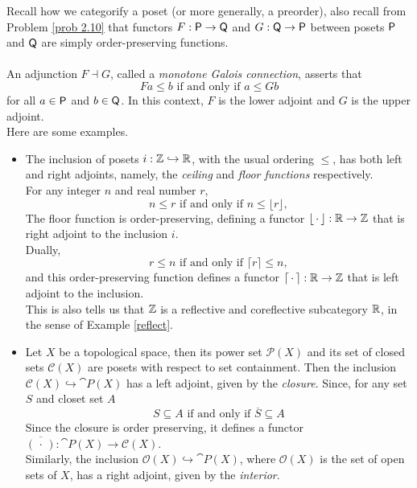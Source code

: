 \begin{example}
Recall how we categorify a poset (or more generally, a preorder), also recall from Problem \ref{prob 2.10} that functors $F : \mathsf{P} \to \mathsf{Q}$ and $G: \mathsf{Q} \to \mathsf{P}$ between posets $\mathsf{P}$ and $\mathsf{Q}$ are simply order-preserving functions.\\
\\
An adjunction $F \dashv G$, called a \emph{monotone Galois connection}, asserts that
\[Fa \leq b \text{ if and only if } a \leq Gb\]
for all $a \in \mathsf{P}$ and $b \in \mathsf{Q}$. In this context, $F$ is the lower adjoint and $G$ is the upper adjoint.\\[0.5em]
Here are some examples.
\begin{itemize}
\item The inclusion of posets $i:\mathbb Z \hookrightarrow \mathbb R$, with the usual ordering $\leq$, has both left and right adjoints, namely, the \emph{ceiling} and \emph{floor functions} respectively.\\[1em]
For any integer $n$ and real number $r$, \[n \leq r \text{ if and only if } n \leq \lfloor r \rfloor,\]
The floor function is order-preserving, defining a functor $\lfloor\,\cdot\,\rfloor: \mathbb R \to \mathbb Z$ that is right adjoint to the inclusion $i$.\\[0.5em]
Dually, \[r \leq n \text{ if and only if } \lceil r\rceil  \leq n,\] and this order-preserving function defines a functor $\lceil\,\cdot\,\rceil: \mathbb R \to \mathbb Z$ that is left adjoint to the inclusion.\\[0.5em]
This is also tells us that $\mathbb Z$ is a reflective and coreflective subcategory $\mathbb R$, in the sense of Example \ref{reflect}.

\item Let $X$ be a topological space, then its power set $\mathscr{P}(X)$ and its set of closed sets $\mathcal{C}(X)$ are posets with respect to set containment. Then the inclusion $\mathcal{C}(X) \hookrightarrow \cat{P}(X)$ has a left adjoint, given by the \emph{closure}. Since, for any set $S$ and closet set $A$
\[S \subseteq A \text{ if and only if } \overline{S} \subseteq A\]
Since the closure is order preserving, it defines a functor $\overline{(\,\cdot\,)}:\cat{P}(X) \to \mathcal{C}(X)$.\\[1em]
Similarly, the inclusion $\mathcal{O}(X) \hookrightarrow \cat{P}(X)$, where $\mathcal{O}(X)$ is the set of open sets of $X$, has a right adjoint, given by the \emph{interior}.


\end{itemize}
\end{example}
